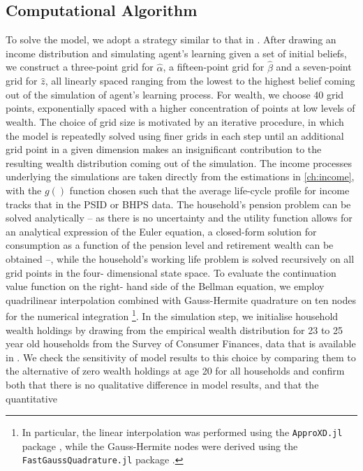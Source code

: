 \subsection{Computational Algorithm}
To solve the model, we adopt a strategy similar to that in \citet{GuvenenSmith2014}.
After drawing an income distribution and simulating agent's learning given a set
of initial beliefs, we construct a three-point grid for $\hat{\alpha}$, a 
fifteen-point grid for $\hat{\beta}$ and a seven-point grid for $\hat{z}$, all
linearly spaced ranging from the lowest to the highest belief coming out of the
simulation of agent's learning process. For wealth, we choose 40 grid points, 
exponentially spaced with a higher concentration of points at low levels of wealth.
The choice of grid size is motivated by an iterative procedure, in which the model
is repeatedly solved using finer grids in each step until an additional grid point
in a given dimension makes an insignificant contribution to the resulting wealth
distribution coming out of the simulation. 
The income processes underlying the simulations are taken directly from the estimations
in \ref{ch:income}, with the $g()$ function chosen such that the average life-cycle
profile for income tracks that in the PSID or BHPS data. 
The household's pension problem can be solved analytically -- as there is no 
uncertainty and the utility function allows for an analytical expression of the 
Euler equation, a closed-form solution for consumption as a function of the 
pension level and retirement wealth can be obtained --, while the household's 
working life problem is solved recursively on all grid points in the four-
dimensional state space. To evaluate the continuation value function on the right-
hand side of the Bellman equation, we employ quadrilinear interpolation combined
with Gauss-Hermite quadrature on ten nodes for the numerical integration
\footnote{In particular, the linear interpolation was performed using the 
\texttt{ApproXD.jl} package \citep{Oswald2014}, while the Gauss-Hermite nodes
were derived using the \texttt{FastGaussQuadrature.jl} package \citep{Townsend2015}.}. In the
simulation step, we initialise household wealth holdings by drawing from the empirical 
wealth distribution for 23 to 25 year old households from the Survey of Consumer
Finances, data that is available in \cite{HintermaierKoeniger2011}. We check 
the sensitivity of model results to this choice by comparing them to the 
alternative of zero wealth holdings at age 20 for all households and confirm both
that there is no qualitative difference in model results, and that the quantitative

